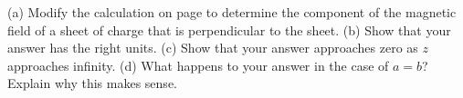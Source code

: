         (a) Modify the calculation on page \pageref{sheetofcurrent} to determine the
        component of the magnetic field of a sheet of charge that is perpendicular to the
        sheet.\answercheck\hwendpart
        (b) Show that your answer has the right units.\hwendpart
        (c) Show that your answer approaches zero as $z$ approaches infinity.\hwendpart
        (d) What happens to your answer in the case of $a=b$? Explain why this
        makes sense.
